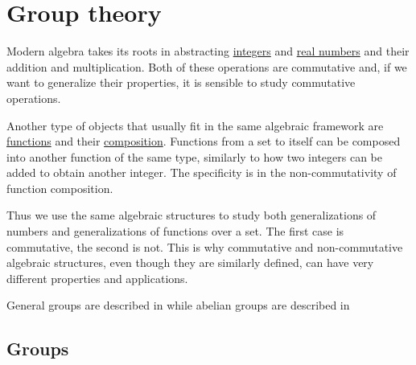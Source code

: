 \section{Group theory}\label{sec:group_theory}

\begin{Remark}\label{remark:numbers_vs_endomorphisms_generalizations}
  Modern algebra takes its roots in abstracting \hyperref[def:integers]{integers} and \hyperref[def:real_numbers]{real numbers} and their addition and multiplication. Both of these operations are commutative and, if we want to generalize their properties, it is sensible to study commutative operations.

  Another type of objects that usually fit in the same algebraic framework are \hyperref[def:function]{functions} and their \hyperref[def:function/composition]{composition}. Functions from a set to itself can be composed into another function of the same type, similarly to how two integers can be added to obtain another integer. The specificity is in the non-commutativity of function composition.

  Thus we use the same algebraic structures to study both generalizations of numbers and generalizations of functions over a set. The first case is commutative, the second is not. This is why commutative and non-commutative algebraic structures, even though they are similarly defined, can have very different properties and applications.

  General groups are described in  while abelian groups are described in 
\end{Remark}

\subsection{Groups}\label{subsec:groups}

